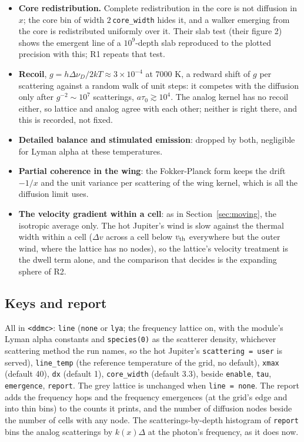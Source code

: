 \documentclass[11pt]{article}
\newcommand{\key}[1]{\texttt{#1}}
\begin{document}
\begin{itemize}
\item \textbf{Core redistribution.}  Complete redistribution in the core is not
  diffusion in $x$; the core bin of width $2\,$\key{core\_width} hides it, and a walker
  emerging from the core is redistributed uniformly over it.  Their slab test (their
  figure 2) shows the emergent line of a $10^9$-depth slab reproduced to the plotted
  precision with this; R1 repeats that test.
\item \textbf{Recoil}, $g = h\Delta\nu_D/2kT \approx 3\times10^{-4}$ at 7000 K, a
  redward shift of $g$ per scattering against a random walk of unit steps: it competes
  with the diffusion only after $g^{-2} \sim 10^7$ scatterings, $a\tau_0 \gtrsim
  10^4$.  The analog kernel has no recoil either, so lattice and analog agree with
  each other; neither is right there, and this is recorded, not fixed.
\item \textbf{Detailed balance and stimulated emission}: dropped by both, negligible
  for Lyman alpha at these temperatures.
\item \textbf{Partial coherence in the wing}: the Fokker-Planck form keeps the drift
  $-1/x$ and the unit variance per scattering of the wing kernel, which is all the
  diffusion limit uses.
\item \textbf{The velocity gradient within a cell}: as in Section~\ref{sec:moving},
  the isotropic average only.  The hot Jupiter's wind is slow against the thermal
  width within a cell ($\Delta v$ across a cell below $v_{\rm th}$ everywhere but the
  outer wind, where the lattice has no nodes), so the lattice's velocity treatment is
  the dwell term alone, and the comparison that decides is the expanding sphere of R2.
\end{itemize}

\subsection{Keys and report}

All in \texttt{<ddmc>}: \key{line} (\texttt{none} or \texttt{lya}; the frequency
lattice on, with the module's Lyman alpha constants and \texttt{species(0)} as the
scatterer density, whichever scattering method the run names, so the hot Jupiter's
\texttt{scattering = user} is served), \key{line\_temp} (the reference temperature of
the grid, no default), \key{xmax} (default 40), \key{dx} (default 1),
\key{core\_width} (default 3.3), beside \key{enable}, \key{tau}, \key{emergence},
\key{report}.  The grey lattice is unchanged when \key{line = none}.  The report adds
the frequency hops and the frequency emergences (at the grid's edge and into thin
bins) to the counts it prints, and the number of diffusion nodes beside the number of
cells with any node.  The scatterings-by-depth histogram of \key{report} bins the
analog scatterings by $k(x)\Delta$ at the photon's frequency, as it does now.
\end{document}
